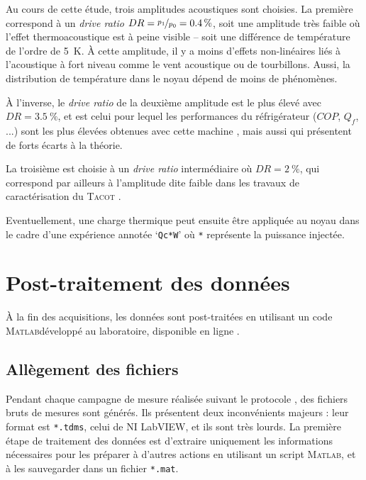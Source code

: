 Au cours de cette étude, trois amplitudes acoustiques sont choisies. La première correspond à un \textit{drive ratio} $DR=\nicefrac{p_1}{p_0}=\qty{.4}{\percent}$, soit une amplitude très faible où l'effet thermoacoustique est à peine visible -- soit une différence de température de l'ordre de \qty{5}{\kelvin}. À cette amplitude, il y a moins d'effets non-linéaires liés à l'acoustique à fort niveau comme le vent acoustique ou de tourbillons. Aussi, la distribution de température dans le noyau dépend de moins de phénomènes.

À l'inverse, le \textit{drive ratio} de la deuxième amplitude est le plus élevé avec $DR=\qty{3.5}{\percent}$, et est celui pour lequel les performances du réfrigérateur ($COP$, $Q_f$, ...) sont les plus élevées obtenues avec cette machine \cite{ramadan_design_2021}, mais aussi qui présentent de forts écarts à la théorie. 

La troisième est choisie à un \textit{drive ratio} intermédiaire où $DR=\qty{2}{\percent}$, qui correspond par ailleurs à l'amplitude dite \og faible \fg{} dans les travaux de caractérisation du \textsc{Tacot} \cite{ramadan_design_2021}. 


Eventuellement, une charge thermique peut ensuite être appliquée au noyau dans le cadre d'une expérience annotée `\texttt{Qc*W}' où \texttt{*} représente la puissance injectée. 

\section{Post-traitement des données}
À la fin des acquisitions, les données sont post-traitées en utilisant un code \textsc{Matlab}\textss\textregistered développé au laboratoire, disponible en ligne \cite{fontbonne_postprocessing_2025}.

\subsection{Allègement des fichiers}
Pendant chaque campagne de mesure réalisée suivant le protocole , des fichiers bruts de mesures sont générés. Ils présentent deux inconvénients majeurs : leur format est \texttt{*.tdms}, celui de NI LabVIEW, et ils sont très lourds. La première étape de traitement des données est d'extraire uniquement les informations nécessaires pour les préparer à d'autres actions en utilisant un script \textsc{Matlab}\textss\textregistered, et à les sauvegarder dans un fichier \texttt{*.mat}.\medskip

